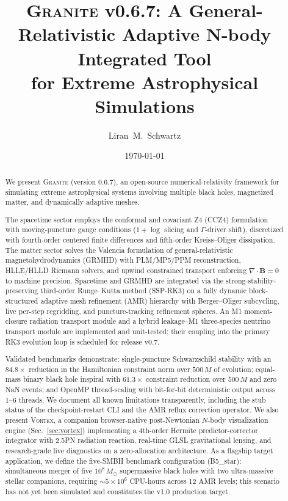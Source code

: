 \documentclass[aps,prd,twocolumn,superscriptaddress,nofootinbib,showpacs,
               longbibliography]{revtex4-2}
\newcommand{\granite}{\textsc{Granite}}
\newcommand{\Msun}{M_\odot}
\begin{document}
\title{%
  \granite{} v0.6.7: A General-Relativistic Adaptive N-body Integrated Tool\\
  for Extreme Astrophysical Simulations%
}

\author{Liran~M.~Schwartz}



\date{\today}

\begin{abstract}
We present \granite{} (version 0.6.7), an open-source numerical-relativity
framework for simulating extreme astrophysical systems involving multiple
black holes, magnetized matter, and dynamically adaptive meshes.

The spacetime sector employs the conformal and covariant Z4 (CCZ4)
formulation~\cite{Alic2012} with moving-puncture gauge conditions
($1+\log$ slicing and $\Gamma$-driver shift), discretized with
fourth-order centered finite differences and fifth-order Kreiss--Oliger
dissipation.
The matter sector solves the Valencia formulation of general-relativistic
magnetohydrodynamics (GRMHD) with PLM/MP5/PPM reconstruction, HLLE/HLLD
Riemann solvers, and upwind constrained transport enforcing $\nabla\cdot
\mathbf{B}=0$ to machine precision.
Spacetime and GRMHD are integrated via the strong-stability-preserving
third-order Runge--Kutta method (SSP-RK3) on a fully dynamic block-structured
adaptive mesh refinement (AMR) hierarchy with Berger--Oliger subcycling,
live per-step regridding, and puncture-tracking refinement spheres.
An M1 moment-closure radiation transport module and a hybrid leakage--M1
three-species neutrino transport module are implemented and unit-tested;
their coupling into the primary RK3 evolution loop is scheduled for
release v0.7.

Validated benchmarks demonstrate: single-puncture Schwarzschild stability
with an $84.8\times$ reduction in the Hamiltonian constraint norm over
$500\,M$ of evolution; equal-mass binary black hole inspiral with
$61.3\times$ constraint reduction over $500\,M$ and zero NaN events; and
OpenMP thread-scaling with bit-for-bit deterministic output across 1--6
threads.
We document all known limitations transparently, including the stub status
of the checkpoint-restart CLI and the AMR reflux correction operator.
We also present \textsc{Vortex}, a companion browser-native post-Newtonian
$N$-body visualization engine (Sec.~\ref{sec:vortex}) implementing a
4th-order Hermite predictor-corrector integrator with 2.5PN radiation
reaction, real-time GLSL gravitational lensing, and research-grade
live diagnostics on a zero-allocation architecture.
As a flagship target application, we define the five-SMBH benchmark
configuration (B5\_star): simultaneous merger of five $10^8\,\Msun$
supermassive black holes with two ultra-massive stellar companions, requiring
${\sim}5\times10^6$ CPU-hours across 12 AMR levels; this scenario has not yet
been simulated and constitutes the v1.0 production target.


\end{abstract}
\end{document}
